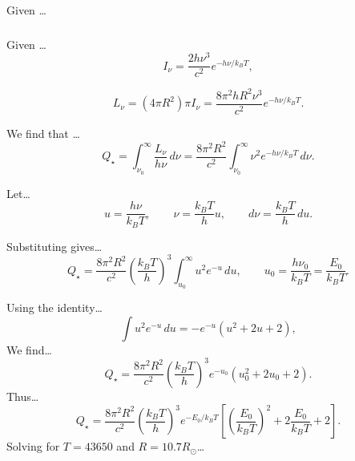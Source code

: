 \documentclass{article}
\begin{document}
Given \dots






\subsubsection{}

Given \dots
\[
I_\nu = \frac{2h\nu^3}{c^2} e^{-h\nu / k_B T},
\]

\[
L_\nu = (4\pi R^2)\pi I_\nu = \frac{8\pi^2 h R^2 \nu^3}{c^2} e^{-h\nu / k_B T}.
\]

We find that \dots
\[
Q_\star = \int_{\nu_0}^{\infty} \frac{L_\nu}{h\nu}\,d\nu
        = \frac{8\pi^2 R^2}{c^2}\int_{\nu_0}^{\infty} \nu^2 e^{-h\nu / k_B T}\,d\nu.
\]

Let\dots
\[
u = \frac{h\nu}{k_B T}, \qquad \nu = \frac{k_B T}{h}u, \qquad d\nu = \frac{k_B T}{h}\,du.
\]

Substituting gives\dots
\[
Q_\star = \frac{8\pi^2 R^2}{c^2}\left(\frac{k_B T}{h}\right)^3 
\int_{u_0}^{\infty} u^2 e^{-u}\,du,
\qquad u_0 = \frac{h\nu_0}{k_B T} = \frac{E_0}{k_B T}.
\]

Using the identity\dots
\[
\int u^2 e^{-u}\,du = -e^{-u}(u^2 + 2u + 2),
\]
We find\dots
\[
Q_\star = \frac{8\pi^2 R^2}{c^2}\left(\frac{k_B T}{h}\right)^3 
e^{-u_0}(u_0^2 + 2u_0 + 2).
\]
Thus\dots
\[
Q_\star = 
\frac{8\pi^2 R^2}{c^2}\left(\frac{k_B T}{h}\right)^3 
e^{-E_0 / k_B T}
\left[
\left(\frac{E_0}{k_B T}\right)^2 
+ 2\frac{E_0}{k_B T} + 2
\right].
\]
Solving for \(T = 43650\) and \(R = 10.7R_\odot\)\dots
\end{document}
